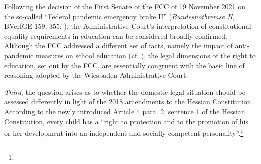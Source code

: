 \documentclass[output=paper,colorlinks,citecolor=brown]{langscibook}
\begin{document}
Following the decision of the First Senate of the FCC of 19 November 2021 on the so-called ``Federal pandemic emergency brake II'' (\textit{Bundesnotbremse II}, BVerfGE 159, 355, \citealt{bverfge2021}), the Administrative Court's interpretation of constitutional equality requirements in education can be considered broadly confirmed. Although the FCC addressed a different set of facts, namely the impact of anti-pan\-demic measures on school education (cf. \citealt{donath2023}), the legal dimensions of the right to education, set out by the FCC, are essentially congruent with the basic line of reasoning adopted by the Wiesbaden Administrative Court.

\textit{Third}, the question arises as to whether the domestic legal situation should be assessed differently in light of the 2018 amendments to the Hessian Constitution. According to the newly introduced Article 4 para. 2, sentence 1 of the Hessian Constitution, every child has a ``right to protection and to the promotion of his or her development into an independent and socially competent personality''.\footnote{%
}
\end{document}
